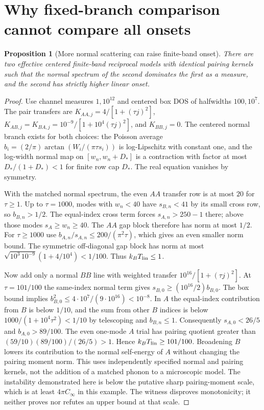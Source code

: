 \documentclass[11pt]{article}
\newtheorem{proposition}[theorem]{Proposition}
\newcommand{\Cinf}{C_\infty}
\newcommand{\Tlin}{T_{\rm lin}}
\begin{document}
\section{Why fixed-branch comparison cannot compare all onsets}
\begin{proposition}[More normal scattering can raise finite-band onset]
There are two effective centered finite-band reciprocal models with identical pairing kernels such that the normal spectrum of the second dominates the first as a measure, and the second has strictly higher linear onset.
\end{proposition}
\begin{proof}
Use channel measures $1,10^{12}$ and centered box DOS of halfwidths $100,10^7$. The pair transfers are $K_{AA,j}=4/[1+(\tau j)^2]$, $K_{AB,j}=K_{BA,j}=10^{-9}/[1+10^4(\tau j)^2]$, and $K_{BB,j}=0$. The centered normal branch exists for both choices: the Poisson average $b_i=(2/\pi)\arctan(W_i/(\pi\tau s_i))$ is log-Lipschitz with constant one, and the log-width normal map on $[w_n,w_n+D_*]$ is a contraction with factor at most $D_* /(1+D_*)<1$ for finite row cap $D_*$. The real equation vanishes by symmetry.

With the matched normal spectrum, the even $AA$ transfer row is at most $20$ for $\tau\ge1$. Up to $\tau=1000$, modes with $w_n<40$ have $s_{B,n}<41$ by its small cross row, so $b_{B,n}>1/2$. The equal-index cross term forces $s_{A,n}>250-1$ there; above those modes $s_A\ge w_n\ge40$. The $AA$ gap block therefore has norm at most $1/2$. For $\tau\ge1000$ use $b_{A,n}/s_{A,n}\le200/(\pi^2\tau)$, which gives an even smaller norm bound. The symmetric off-diagonal gap block has norm at most $\sqrt{10^3\,10^{-9}}(1+4/10^4)<1/100$. Thus $k_B\Tlin\le1$.

Now add only a normal $BB$ line with weighted transfer $10^{16}/[1+(\tau j)^2]$. At $\tau=101/100$ the same-index normal term gives $s_{B,0}\ge (10^{16}/2)b_{B,0}$. The box bound implies $b_{B,0}^2\le4\cdot10^7/(9\cdot10^{16})<10^{-8}$. In $A$ the equal-index contribution from $B$ is below $1/10$, and the sum from other $B$ indices is below $1000/(1+10^4\tau^2)<1/10$ by telescoping and $b_{B,n}\le1$. Consequently $s_{A,0}<26/5$ and $b_{A,0}>89/100$. The even one-mode $A$ trial has pairing quotient greater than $(59/10)(89/100)/(26/5)>1$. Hence $k_B\Tlin\ge101/100$. Broadening $B$ lowers its contribution to the normal self-energy of $A$ without changing the pairing moment norm. This uses independently specified normal and pairing kernels, not the addition of a matched phonon to a microscopic model. The instability demonstrated here is below the putative sharp pairing-moment scale, which is at least $4\pi\Cinf$ in this example. The witness disproves monotonicity; it neither proves nor refutes an upper bound at that scale.
\end{proof}
\end{document}
